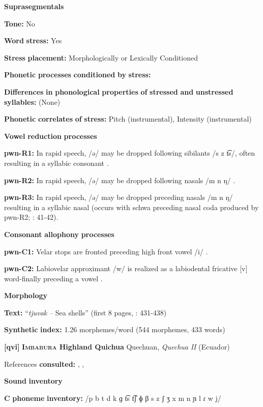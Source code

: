 \begin{styleBody}
\textbf{Suprasegmentals}

\textbf{Tone:} No

\textbf{Word} \textbf{stress:} Yes

\textbf{Stress} \textbf{placement:} Morphologically or Lexically Conditioned

\textbf{Phonetic} \textbf{processes} \textbf{conditioned} \textbf{by} \textbf{stress:}

\textbf{Differences} \textbf{in} \textbf{phonological} \textbf{properties} \textbf{of} \textbf{stressed} \textbf{and} \textbf{unstressed} \textbf{syllables:} (None)

\textbf{Phonetic} \textbf{correlates} \textbf{of} \textbf{stress:} Pitch (instrumental), Intensity (instrumental)

\textbf{Vowel} \textbf{reduction} \textbf{processes}

\textbf{pwn-R1:} In rapid speech, /ə/ may be dropped following sibilants /s z t͡s/, often resulting in a syllabic consonant \citep[40-41]{Chang2006}.

\textbf{pwn-R2:} In rapid speech, /ə/ may be dropped following nasals /m n ŋ/ \citep[41]{Chang2006}.

\textbf{pwn-R3:} In rapid speech, /ə/ may be dropped preceding nasals /m n ŋ/ resulting in a syllabic nasal (occurs with schwa preceding nasal coda produced by pwn-R2; \citealt{Chang2006}: 41-42).

\textbf{Consonant} \textbf{allophony} \textbf{processes}

\textbf{pwn-C1:} Velar stops are fronted preceding high front vowel /i/ \citep[22]{Chang2006}.

\textbf{pwn-C2:} Labiovelar approximant /w/ is realized as a labiodental fricative [v] word-finally preceding a vowel \citep[40]{Chang2006}.

\textbf{Morphology}

\textbf{Text:} “\textit{tjuvak} \textit{--} Sea shells” (first 8 pages, \citealt{Chang2006}: 431-438)

\textbf{Synthetic} \textbf{index:} 1.26 morphemes/word (544 morphemes, 433 words)

\textbf{[qvi]}   \textbf{\textsc{Imbabura} \textbf{Highland} \textbf{Quichua}}    Quechuan, \textit{Quechua} \textit{II} (Ecuador)

References \textbf{consulted:} \citet{Carpenter1982}, \citet{Cole1982}, \citet{Jake1983}

\textbf{Sound} \textbf{inventory}

\textbf{C} \textbf{phoneme} \textbf{inventory:} /p b t d k ɡ t͡s t͡ʃ ɸ β s z ʃ ʒ x m n ɲ l ɾ w j/


\end{styleBody}
